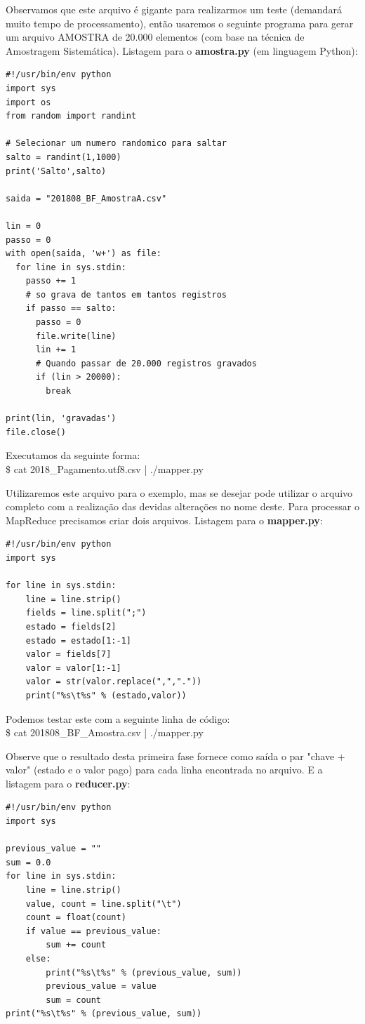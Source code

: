 \documentclass[a4paper,11pt]{article}
\begin{document}
Observamos que este arquivo é gigante para realizarmos um teste (demandará muito tempo de processamento), então usaremos o seguinte programa para gerar um arquivo AMOSTRA de 20.000 elementos (com base na técnica de Amostragem Sistemática). Listagem para o \textbf{amostra.py} (em linguagem Python):
\begin{lstlisting}
#!/usr/bin/env python
import sys
import os
from random import randint

# Selecionar um numero randomico para saltar
salto = randint(1,1000)
print('Salto',salto)

saida = "201808_BF_AmostraA.csv"

lin = 0
passo = 0
with open(saida, 'w+') as file:
  for line in sys.stdin:
    passo += 1
    # so grava de tantos em tantos registros
    if passo == salto:
      passo = 0
      file.write(line)            
      lin += 1
      # Quando passar de 20.000 registros gravados
      if (lin > 20000):
        break

print(lin, 'gravadas')
file.close()
\end{lstlisting}

Executamos da seguinte forma: \\
{\ttfamily\$ cat 2018\_Pagamento.utf8.csv | ./mapper.py}

Utilizaremos este arquivo para o exemplo, mas se desejar pode utilizar o arquivo completo com a realização das devidas alterações no nome deste. Para processar o MapReduce precisamos criar dois arquivos. Listagem para o \textbf{mapper.py}:
\begin{lstlisting}
#!/usr/bin/env python
import sys

for line in sys.stdin:
	line = line.strip()
	fields = line.split(";")
	estado = fields[2]
	estado = estado[1:-1]
	valor = fields[7]
	valor = valor[1:-1]
	valor = str(valor.replace(",","."))
	print("%s\t%s" % (estado,valor))
\end{lstlisting}

Podemos testar este com a seguinte linha de código: \\
{\ttfamily\$ cat 201808\_BF\_Amostra.csv | ./mapper.py}

Observe que o resultado desta primeira fase fornece como saída o par "chave + valor" (estado e o valor pago) para cada linha encontrada no arquivo. E a listagem para o \textbf{reducer.py}:
\begin{lstlisting}
#!/usr/bin/env python
import sys

previous_value = ""
sum = 0.0
for line in sys.stdin:
	line = line.strip()
	value, count = line.split("\t")
	count = float(count)
	if value == previous_value:
		sum += count
	else:
		print("%s\t%s" % (previous_value, sum))
		previous_value = value
		sum = count
print("%s\t%s" % (previous_value, sum))
\end{lstlisting}
\end{document}
